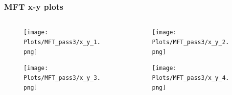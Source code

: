 \documentclass[11pt]{beamer}
\begin{document}
\begin{frame}
    \frametitle{MFT x-y plots}

    \begin{columns}[c]
        \begin{column}{0.5\textwidth}
            \begin{figure}
                \begin{center}
                    \texttt{[image: Plots/MFT\_pass3/x\_y\_1.png]}
                \end{center}
            \end{figure}
            \begin{figure}
                \begin{center}
                    \texttt{[image: Plots/MFT\_pass3/x\_y\_3.png]}
                \end{center}
            \end{figure}
        \end{column}
        \begin{column}{0.5\textwidth}
            \begin{figure}
                \begin{center}
                    \texttt{[image: Plots/MFT\_pass3/x\_y\_2.png]}
                \end{center}
            \end{figure}
            \begin{figure}
                \begin{center}
                    \texttt{[image: Plots/MFT\_pass3/x\_y\_4.png]}
                \end{center}
            \end{figure}
        \end{column}
    \end{columns}

\end{frame}
\end{document}

